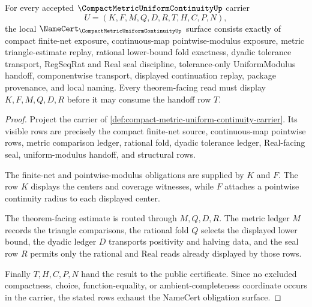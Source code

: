 \begin{theorem}
\label{thm:compact-metric-uniform-continuity-namecert-obligations}
For every accepted $\CompactMetricUniformContinuityUp$ carrier
$$
U=(K,F,M,Q,D,R,T,H,C,P,N),
$$
the local $\NameCert_{\CompactMetricUniformContinuityUp}$ surface consists exactly of compact finite-net exposure, continuous-map pointwise-modulus exposure, metric triangle-estimate replay, rational lower-bound fold exactness, dyadic tolerance transport, RegSeqRat and Real seal discipline, tolerance-only UniformModulus handoff, componentwise transport, displayed continuation replay, package provenance, and local naming. Every theorem-facing read must display $K,F,M,Q,D,R$ before it may consume the handoff row $T$.
\end{theorem}
\begin{proof}
Project the carrier of \autoref{def:compact-metric-uniform-continuity-carrier}. Its visible rows are precisely the compact finite-net source, continuous-map pointwise rows, metric comparison ledger, rational fold, dyadic tolerance ledger, Real-facing seal, uniform-modulus handoff, and structural rows.

The finite-net and pointwise-modulus obligations are supplied by $K$ and $F$. The row $K$ displays the centers and coverage witnesses, while $F$ attaches a pointwise continuity radius to each displayed center.

The theorem-facing estimate is routed through $M,Q,D,R$. The metric ledger $M$ records the triangle comparisons, the rational fold $Q$ selects the displayed lower bound, the dyadic ledger $D$ transports positivity and halving data, and the seal row $R$ permits only the rational and Real reads already displayed by those rows.

Finally $T,H,C,P,N$ hand the result to the public certificate. Since no excluded compactness, choice, function-equality, or ambient-completeness coordinate occurs in the carrier, the stated rows exhaust the NameCert obligation surface.
\end{proof}

